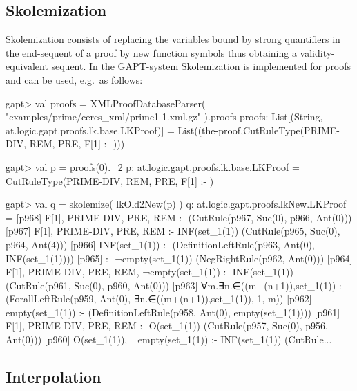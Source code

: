 \documentclass[a4paper,11pt]{article}
\begin{document}
\subsection{Skolemization}

Skolemization consists of replacing the variables bound by strong quantifiers in the end-sequent of a proof
by new function symbols thus obtaining a validity-equivalent sequent. In the GAPT-system Skolemization
is implemented for proofs and can be used, e.g.~as follows:
%
\begin{clilisting}
gapt> val proofs = XMLProofDatabaseParser( "examples/prime/ceres_xml/prime1-1.xml.gz" ).proofs
proofs: List[(String, at.logic.gapt.proofs.lk.base.LKProof)] = List((the-proof,CutRuleType(PRIME-DIV, REM, PRE, F[1] :- )))

gapt> val p = proofs(0)._2
p: at.logic.gapt.proofs.lk.base.LKProof = CutRuleType(PRIME-DIV, REM, PRE, F[1] :- )

gapt> val q = skolemize( lkOld2New(p) )
q: at.logic.gapt.proofs.lkNew.LKProof =
[p968] F[1], PRIME-DIV, PRE, REM :-     (CutRule(p967, Suc(0), p966, Ant(0)))
[p967] F[1], PRIME-DIV, PRE, REM :- INF(set_1(1))    (CutRule(p965, Suc(0), p964, Ant(4)))
[p966] INF(set_1(1)) :-     (DefinitionLeftRule(p963, Ant(0), INF(set_1(1))))
[p965]  :- ¬empty(set_1(1))    (NegRightRule(p962, Ant(0)))
[p964] F[1], PRIME-DIV, PRE, REM, ¬empty(set_1(1)) :- INF(set_1(1))    (CutRule(p961, Suc(0), p960, Ant(0)))
[p963] ∀m.∃n.∈((m+(n+1)),set_1(1)) :-     (ForallLeftRule(p959, Ant(0), ∃n.∈((m+(n+1)),set_1(1)), 1, m))
[p962] empty(set_1(1)) :-     (DefinitionLeftRule(p958, Ant(0), empty(set_1(1))))
[p961] F[1], PRIME-DIV, PRE, REM :- O(set_1(1))    (CutRule(p957, Suc(0), p956, Ant(0)))
[p960] O(set_1(1)), ¬empty(set_1(1)) :- INF(set_1(1))    (CutRule...
\end{clilisting}


\subsection{Interpolation}

\end{document}
